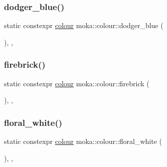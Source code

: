 \subsubsection{\texorpdfstring{dodger\_blue()}{dodger\_blue()}}
{\footnotesize\ttfamily static constexpr \mbox{\hyperlink{classmoka_1_1colour}{colour}} moka\+::colour\+::dodger\+\_\+blue (\begin{DoxyParamCaption}{ }\end{DoxyParamCaption})\hspace{0.3cm}{\ttfamily [inline]}, {\ttfamily [static]}, {\ttfamily [noexcept]}}

\mbox{\label{classmoka_1_1colour_ace02c8f9aca135461aacccc6a7774d9e}} 
\subsubsection{\texorpdfstring{firebrick()}{firebrick()}}
{\footnotesize\ttfamily static constexpr \mbox{\hyperlink{classmoka_1_1colour}{colour}} moka\+::colour\+::firebrick (\begin{DoxyParamCaption}{ }\end{DoxyParamCaption})\hspace{0.3cm}{\ttfamily [inline]}, {\ttfamily [static]}, {\ttfamily [noexcept]}}

\mbox{\label{classmoka_1_1colour_a4cd964a1fab43bf0c7bb3d007428d043}} 
\subsubsection{\texorpdfstring{floral\_white()}{floral\_white()}}
{\footnotesize\ttfamily static constexpr \mbox{\hyperlink{classmoka_1_1colour}{colour}} moka\+::colour\+::floral\+\_\+white (\begin{DoxyParamCaption}{ }\end{DoxyParamCaption})\hspace{0.3cm}{\ttfamily [inline]}, {\ttfamily [static]}, {\ttfamily [noexcept]}}

\mbox{\label{classmoka_1_1colour_ad3f3234e6667e4d9eb33bcf8ea082df1}} 
